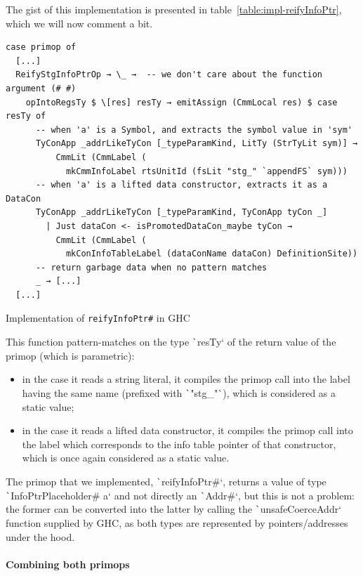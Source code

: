 \documentclass[english]{jflart}
\begin{document}
The gist of this implementation is presented in table~\ref{table:impl-reifyInfoPtr}, which we will now comment a bit.

\begin{table}[t]
\small
\begin{verbatim}
case primop of
  [...]
  ReifyStgInfoPtrOp → \_ →  -- we don't care about the function argument (# #)
    opIntoRegsTy $ \[res] resTy → emitAssign (CmmLocal res) $ case resTy of
      -- when 'a' is a Symbol, and extracts the symbol value in 'sym'
      TyConApp _addrLikeTyCon [_typeParamKind, LitTy (StrTyLit sym)] →
          CmmLit (CmmLabel (
            mkCmmInfoLabel rtsUnitId (fsLit "stg_" `appendFS` sym)))
      -- when 'a' is a lifted data constructor, extracts it as a DataCon
      TyConApp _addrLikeTyCon [_typeParamKind, TyConApp tyCon _]
        | Just dataCon <- isPromotedDataCon_maybe tyCon →
          CmmLit (CmmLabel (
            mkConInfoTableLabel (dataConName dataCon) DefinitionSite))
      -- return garbage data when no pattern matches
      _ → [...]
  [...]
\end{verbatim}
\caption{Implementation of \texttt{reifyInfoPtr\#} in GHC}
\label{table:impl-reifyInfoPtr}
\end{table}

This function pattern-matches on the type \texttt`resTy` of the return value of the primop (which is parametric):
\begin{itemize}
  \item in the case it reads a string literal, it compiles the primop call into the label having the same name (prefixed with \texttt`"stg_"`), which is considered as a static value;
  \item in the case it reads a lifted data constructor, it compiles the primop call into the label which corresponds to the info table pointer of that constructor, which is once again considered as a static value.
\end{itemize}

The primop that we implemented, \texttt`reifyInfoPtr#`, returns a value of type \texttt`InfoPtrPlaceholder# a` and not directly an \texttt`Addr#`, but this is not a problem: the former can be converted into the latter by calling the \texttt`unsafeCoerceAddr` function supplied by GHC, as both types are represented by pointers/addresses under the hood.

\paragraph{Combining both primops}
\end{document}
